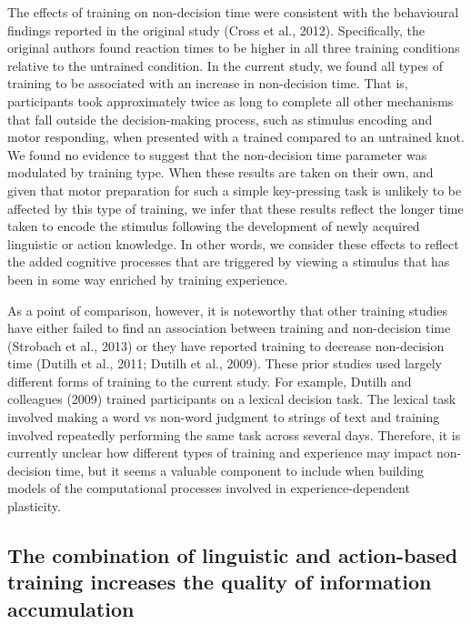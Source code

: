 \documentclass[
  man, donotrepeattitle,floatsintext]{apa6}
\begin{document}
The effects of training on non-decision time were consistent with the behavioural findings reported in the original study (Cross et al., 2012). Specifically, the original authors found reaction times to be higher in all three training conditions relative to the untrained condition. In the current study, we found all types of training to be associated with an increase in non-decision time. That is, participants took approximately twice as long to complete all other mechanisms that fall outside the decision-making process, such as stimulus encoding and motor responding, when presented with a trained compared to an untrained knot. We found no evidence to suggest that the non-decision time parameter was modulated by training type. When these results are taken on their own, and given that motor preparation for such a simple key-pressing task is unlikely to be affected by this type of training, we infer that these results reflect the longer time taken to encode the stimulus following the development of newly acquired linguistic or action knowledge. In other words, we consider these effects to reflect the added cognitive processes that are triggered by viewing a stimulus that has been in some way enriched by training experience.

As a point of comparison, however, it is noteworthy that other training studies have either failed to find an association between training and non-decision time (Strobach et al., 2013) or they have reported training to decrease non-decision time (Dutilh et al., 2011; Dutilh et al., 2009). These prior studies used largely different forms of training to the current study. For example, Dutilh and colleagues (2009) trained participants on a lexical decision task. The lexical task involved making a word vs non-word judgment to strings of text and training involved repeatedly performing the same task across several days. Therefore, it is currently unclear how different types of training and experience may impact non-decision time, but it seems a valuable component to include when building models of the computational processes involved in experience-dependent plasticity.

\subsection{The combination of linguistic and action-based training increases the quality of information accumulation}\label{the-combination-of-linguistic-and-action-based-training-increases-the-quality-of-information-accumulation}
\end{document}
